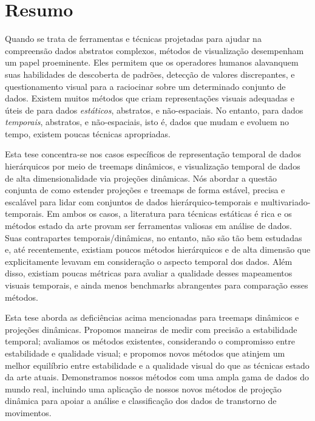 \newpage


\manualmark
{} 

\chapter*{Resumo}

Quando se trata de ferramentas e técnicas projetadas para ajudar na compreensão dados abstratos complexos, métodos de visualização desempenham um papel proeminente. Eles permitem que os operadores humanos alavanquem suas habilidades de descoberta de padrões, detecção de valores discrepantes, e questionamento visual para a raciocinar sobre um determinado conjunto de dados. 
Existem muitos métodos que criam representações visuais adequadas e úteis de para dados \emph{estáticos}, abstratos, e não-espaciais. No entanto, para dados \emph{temporais}, abstratos, e não-espaciais, isto é, dados que mudam e evoluem no tempo, existem poucas técnicas apropriadas.

Esta tese concentra-se nos casos específicos de representação temporal de dados hierárquicos por meio de treemaps dinâmicos, e visualização temporal de dados de alta dimensionalidade via projeções dinâmicas. Nós abordar a questão conjunta de como estender projeções e treemaps de forma estável, precisa e escalável para lidar  com conjuntos de dados hierárquico-temporais e multivariado-temporais.
Em ambos os casos, a literatura para técnicas estáticas é rica e os métodos estado da arte provam ser ferramentas valiosas em análise de dados. Suas contrapartes temporais/dinâmicas, no entanto, não são tão bem estudadas e, até recentemente, existiam poucos métodos hierárquicos e de alta dimensão que explicitamente levavam em consideração o aspecto temporal dos dados. Além disso, existiam poucas métricas para avaliar a qualidade desses mapeamentos visuais temporais, e ainda menos benchmarks abrangentes para comparação esses métodos. 

Esta tese aborda as deficiências acima mencionadas para treemaps dinâmicos e projeções dinâmicas. Propomos maneiras de medir com precisão a estabilidade temporal; avaliamos os métodos existentes, considerando o compromisso entre estabilidade e qualidade visual; e propomos novos métodos que atinjem um melhor equilíbrio entre estabilidade e a qualidade visual do que as técnicas estado da arte atuais. Demonstramos nossos métodos com uma ampla gama de dados do mundo real, incluindo uma aplicação de nossos novos métodos de projeção dinâmica para apoiar a análise e classificação dos dados de transtorno de movimentos. 



\endgroup			
